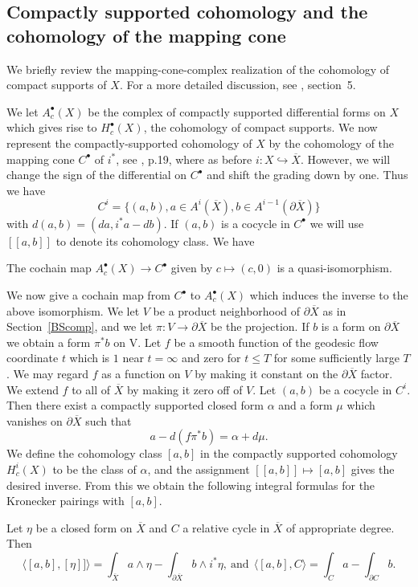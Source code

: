 \subsection{Compactly supported cohomology and the cohomology of the mapping cone}\label{mappingconesection}

\vskip 0.5in

We briefly review the mapping-cone-complex realization of the cohomology of compact supports of $X$. For a more detailed discussion, see \cite{FMspec}, section~5. 

\vskip 0.5in

We let $A_c^{\bullet}(X)$ be the complex of compactly supported differential forms on $X$ which gives rise to $H_c^{\bullet}(X)$, the cohomology of compact supports. We now represent the compactly-supported cohomology of $X$ by the cohomology of the mapping cone $C^{\bullet}$ of $i^*$, see \cite{Weibel}, p.19, where as before $i: X \hookrightarrow \overline{X}$. However, we will change the sign of the differential on $C^{\bullet}$ and shift the grading down by one. Thus we have
$$C^i =\{ (a,b), a \in A^i (\overline{X}), b \in A^{i-1}(\partial \overline{X})\}$$
with $d(a,b) = (da, i^*a - db)$.
If $(a,b)$ is a cocycle in $C^{\bullet}$ we will use $[[a,b]]$ to denote its cohomology class. We have
\begin{proposition} \label{quasiiso}
The cochain map $A_c^{\bullet}(X) \to C^{\bullet}$ given by $c \mapsto (c,0)$ is a quasi-isomorphism.
\end{proposition}

\vskip 0.5in

We now give a cochain map from $C^{\bullet}$ to $ A_c^{\bullet}(X)$ which induces the inverse to the above isomorphism. We let $V$ be a product neighborhood of $\partial \overline{X}$ as in Section~\ref{BScomp}, and we let $\pi:V \to \partial \overline{X}$ be the projection. If $b$ is a form on $\partial \overline{X}$ we obtain a form $\pi^{\ast} b$ on V. Let $f$ be a smooth function of the geodesic flow coordinate $t$ which is $1$ near $t=\infty$ and zero for $t \leq T$
for some sufficiently large $T$. We may regard $f$ as a function on $V$ by making it constant on the $\partial \overline{X}$ factor. We extend $f$ to all of $ \overline{X}$ by making it zero off of $V$. Let $(a,b)$ be a cocycle in $C^i$. Then there exist a compactly supported closed form $\alpha $ and a form $\mu$ which vanishes on $\partial \overline{X}$ such that
\[
a - d(f \pi^{\ast}b ) = \alpha + d\mu.
\]
We define the cohomology class $[a,b]$ in the compactly supported  cohomology $H^i_c(X)$ to be the class of $\alpha$, and the assignment $[[a,b]] \mapsto [a,b]$ gives the desired inverse. From this we obtain the  following integral formulas for the Kronecker pairings with $[a,b]$. 
\vskip 0.5in
\begin{lemma}\label{integralformula}
Let $\eta$ be a closed form on $\overline{X}$ and $C$ a relative cycle in $\overline{X}$ of appropriate degree. Then 
$$
\langle[a, b], [\eta]]\rangle 
= \int_{\overline{X}}a\wedge \eta - \int_{\partial \overline{X}} b \wedge i^*\eta, \ \text{and} \ \  
\langle [a,b],C \rangle =  \int_{C}a - \int_{\partial C} b.$$
\end{lemma}
\vskip 0.5in

